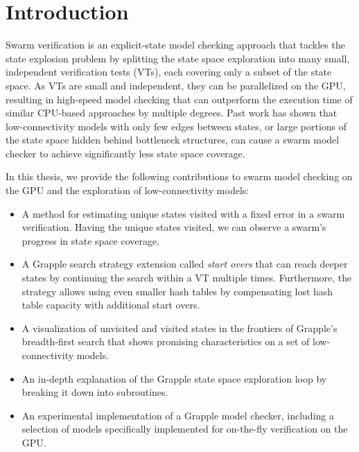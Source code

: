\documentclass[
fancyheadings, %
%
%
]{stsreprt}
\begin{document}
\tableofcontents
\listofalgorithms
\listoffigures
\listoftables

\mainmatter

\chapter{Introduction}

Swarm verification is an explicit-state model checking approach that tackles the state explosion problem by splitting the state space exploration into many small, independent verification tests (VTs), each covering only a subset of the state space.
As VTs are small and independent, they can be parallelized on the GPU, resulting in high-speed model checking that can outperform the execution time of similar CPU-based approaches by multiple degrees.
Past work has shown that low-connectivity models with only few edges between states, or large portions of the state space hidden behind bottleneck structures, can cause a swarm model checker to achieve significantly less state space coverage.


In this thesis, we provide the following contributions to swarm model checking on the GPU and the exploration of low-connectivity models:

\begin{itemize}
    \item A method for estimating unique states visited with a fixed error in a swarm verification.
          Having the unique states visited, we can observe a swarm's progress in state space coverage.
    \item A Grapple search strategy extension called \emph{start overs} that can reach deeper states by continuing the search within a VT multiple times.
          Furthermore, the strategy allows using even smaller hash tables by compensating lost hash table capacity with additional start overs.
    \item A visualization of unvisited and visited states in the frontiers of Grapple's breadth-first search that shows promising characteristics on a set of low-connectivity models.
    \item An in-depth explanation of the Grapple state space exploration loop by breaking it down into subroutines.
    \item An experimental implementation of a Grapple model checker, including a selection of models specifically implemented for on-the-fly verification on the GPU.
\end{itemize}
\end{document}
